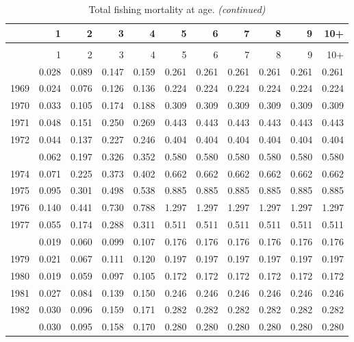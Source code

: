 \documentclass[
]{article}
\begin{document}
\begin{longtable}[t]{lrrrrrrrrrr}
\caption{\label{tab:FAA-tot-table}Total fishing mortality at age.}\\
\toprule
  & 1 & 2 & 3 & 4 & 5 & 6 & 7 & 8 & 9 & 10+\\
\midrule
\endfirsthead
\caption[]{Total fishing mortality at age. \textit{(continued)}}\\
\toprule
  & 1 & 2 & 3 & 4 & 5 & 6 & 7 & 8 & 9 & 10+\\
\midrule
\endhead

\endfoot
\bottomrule
\endlastfoot
1968 & 0.028 & 0.089 & 0.147 & 0.159 & 0.261 & 0.261 & 0.261 & 0.261 & 0.261 & 0.261\\
1969 & 0.024 & 0.076 & 0.126 & 0.136 & 0.224 & 0.224 & 0.224 & 0.224 & 0.224 & 0.224\\
1970 & 0.033 & 0.105 & 0.174 & 0.188 & 0.309 & 0.309 & 0.309 & 0.309 & 0.309 & 0.309\\
1971 & 0.048 & 0.151 & 0.250 & 0.269 & 0.443 & 0.443 & 0.443 & 0.443 & 0.443 & 0.443\\
1972 & 0.044 & 0.137 & 0.227 & 0.246 & 0.404 & 0.404 & 0.404 & 0.404 & 0.404 & 0.404\\
\addlinespace
1973 & 0.062 & 0.197 & 0.326 & 0.352 & 0.580 & 0.580 & 0.580 & 0.580 & 0.580 & 0.580\\
1974 & 0.071 & 0.225 & 0.373 & 0.402 & 0.662 & 0.662 & 0.662 & 0.662 & 0.662 & 0.662\\
1975 & 0.095 & 0.301 & 0.498 & 0.538 & 0.885 & 0.885 & 0.885 & 0.885 & 0.885 & 0.885\\
1976 & 0.140 & 0.441 & 0.730 & 0.788 & 1.297 & 1.297 & 1.297 & 1.297 & 1.297 & 1.297\\
1977 & 0.055 & 0.174 & 0.288 & 0.311 & 0.511 & 0.511 & 0.511 & 0.511 & 0.511 & 0.511\\
\addlinespace
1978 & 0.019 & 0.060 & 0.099 & 0.107 & 0.176 & 0.176 & 0.176 & 0.176 & 0.176 & 0.176\\
1979 & 0.021 & 0.067 & 0.111 & 0.120 & 0.197 & 0.197 & 0.197 & 0.197 & 0.197 & 0.197\\
1980 & 0.019 & 0.059 & 0.097 & 0.105 & 0.172 & 0.172 & 0.172 & 0.172 & 0.172 & 0.172\\
1981 & 0.027 & 0.084 & 0.139 & 0.150 & 0.246 & 0.246 & 0.246 & 0.246 & 0.246 & 0.246\\
1982 & 0.030 & 0.096 & 0.159 & 0.171 & 0.282 & 0.282 & 0.282 & 0.282 & 0.282 & 0.282\\
\addlinespace
1983 & 0.030 & 0.095 & 0.158 & 0.170 & 0.280 & 0.280 & 0.280 & 0.280 & 0.280 & 0.280\\

\end{longtable}
\end{document}
